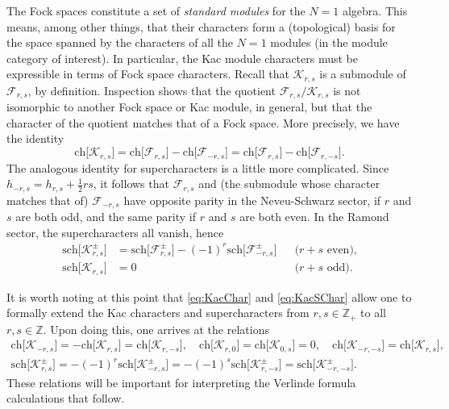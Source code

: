 \documentclass[a4paper,reqno,12pt]{report}
\theoremstyle{definition}
\numberwithin{equation}{section}
\newcommand{\ZZ}{\mathbb{Z}}
\newcommand{\Kac}[1]{\mathcal{K}_{#1}}       %
\newcommand{\Fock}[1]{\mathcal{F}_{#1}}      %
\newcommand{\chmap}{\mathrm{ch}}
\newcommand{\schmap}{\mathrm{sch}}
\newcommand{\Gr}[1]{\bigl[ #1 \bigr]}            %
\newcommand{\ch}[1]{\chmap \Gr{#1}}              %
\newcommand{\sch}[1]{\schmap \Gr{#1}}              %
\newcommand{\ns}{Neveu-Schwarz}
\theoremstyle{plain}
\begin{document}
The Fock spaces constitute a set of \emph{standard modules} \cite{CreLog13,RidVer14} for the $N=1$ algebra.  This means, among other things, that their characters form a (topological) basis for the space spanned by the characters of all the $N=1$ modules (in the module category of interest).  In particular, the Kac module characters must be expressible in terms of Fock space characters.  Recall that $\Kac{r,s}$ is a submodule of $\Fock{r,s}$, by definition.  Inspection shows that the quotient $\Fock{r,s} / \Kac{r,s}$ is not isomorphic to another Fock space or Kac module, in general, but that the character of the quotient matches that of a Fock space.  More precisely, we have the identity
\begin{equation} \label{eq:KacChar}
\ch{\Kac{r,s}} = \ch{\Fock{r,s}} - \ch{\Fock{-r,s}} = \ch{\Fock{r,s}} - \ch{\Fock{r,-s}}.
\end{equation}
The analogous identity for supercharacters is a little more complicated.  Since $h_{-r,s} = h_{r,s} + \frac{1}{2} rs$, it follows that $\Fock{r,s}$ and (the submodule whose character matches that of) $\Fock{-r,s}$ have opposite parity in the \ns{} sector, if $r$ and $s$ are both odd, and the same parity if $r$ and $s$ are both even.  In the Ramond sector, the supercharacters all vanish, hence
\begin{equation} \label{eq:KacSChar}
\begin{aligned}
\sch{\Kac{r,s}^{\pm}} &= \sch{\Fock{r,s}^{\pm}} - (-1)^r \sch{\Fock{-r,s}^{\pm}} & &\text{(\(r+s\) even),} \\
\sch{\Kac{r,s}} &= 0 & &\text{(\(r+s\) odd).}
\end{aligned}
\end{equation}

It is worth noting at this point that \eqref{eq:KacChar} and \eqref{eq:KacSChar} allow one to formally extend the Kac characters and supercharacters from $r,s \in \ZZ_+$ to all $r,s \in \ZZ$.  Upon doing this, one arrives at the relations
\begin{equation} \label{eq:ChSchRels}
\begin{gathered}
\ch{\Kac{-r,s}} = -\ch{\Kac{r,s}} = \ch{\Kac{r,-s}}, \quad \ch{\Kac{r,0}} = \ch{\Kac{0,s}} = 0, \quad \ch{\Kac{-r,-s}} = \ch{\Kac{r,s}}, \\
\sch{\Kac{r,s}^{\pm}} = -(-1)^r \sch{\Kac{-r,s}^{\pm}} = -(-1)^s \sch{\Kac{r,-s}^{\pm}} = \sch{\Kac{-r,-s}^{\pm}}.
\end{gathered}
\end{equation}
These relations will be important for interpreting the Verlinde formula calculations that follow.
\end{document}
